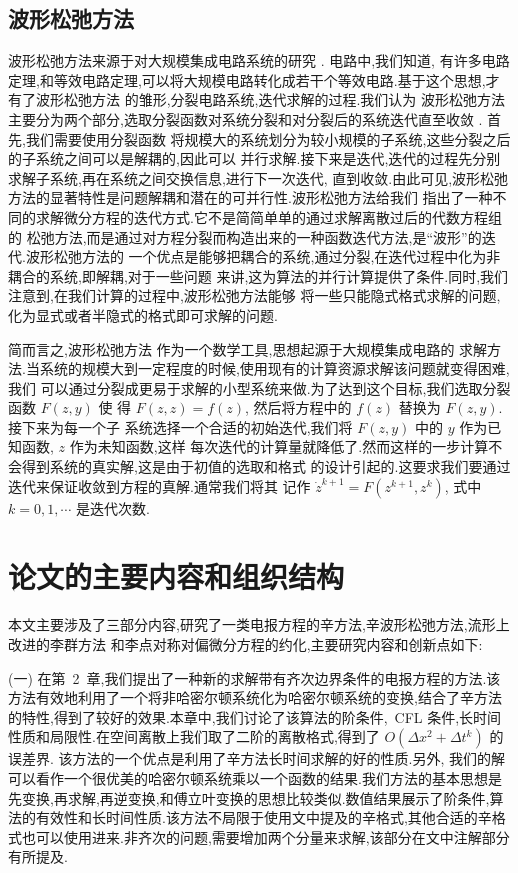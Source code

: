 \subsection{波形松弛方法}

波形松弛方法来源于对大规模集成电路系统的研究 \cite{lelarasmee1982waveform}. 电路中,我们知道,
有许多电路定理,和等效电路定理,可以将大规模电路转化成若干个等效电路.基于这个思想,才有了波形松弛方法
的雏形,分裂电路系统,迭代求解的过程.我们认为
波形松弛方法主要分为两个部分,选取分裂函数对系统分裂和对分裂后的系统迭代直至收敛
 \cite{jiang2009wr,burrage1995parallel,jacob1985waveform}. 首先,我们需要使用分裂函数
 将规模大的系统划分为较小规模的子系统,这些分裂之后的子系统之间可以是解耦的,因此可以
 并行求解.接下来是迭代,迭代的过程先分别求解子系统,再在系统之间交换信息,进行下一次迭代,
直到收敛.由此可见,波形松弛方法的显著特性是问题解耦和潜在的可并行性.波形松弛方法给我们
指出了一种不同的求解微分方程的迭代方式.它不是简简单单的通过求解离散过后的代数方程组的
松弛方法,而是通过对方程分裂而构造出来的一种函数迭代方法,是``波形''的迭代.波形松弛方法的
一个优点是能够把耦合的系统,通过分裂,在迭代过程中化为非耦合的系统,即解耦,对于一些问题
来讲,这为算法的并行计算提供了条件.同时,我们注意到,在我们计算的过程中,波形松弛方法能够
将一些只能隐式格式求解的问题,化为显式或者半隐式的格式即可求解的问题.

简而言之,波形松弛方法 \cite{jiang2009wr} 作为一个数学工具,思想起源于大规模集成电路的
求解方法.当系统的规模大到一定程度的时候,使用现有的计算资源求解该问题就变得困难,我们
可以通过分裂成更易于求解的小型系统来做.为了达到这个目标,我们选取分裂函数 $F(z,y)$ 使
得 $F(z,z)=f(z)$, 然后将方程中的 $f(z)$ 替换为 $F(z,y)$. 接下来为每一个子
系统选择一个合适的初始迭代,我们将 $F(z,y)$ 中的 $y$ 作为已知函数, $z$ 作为未知函数,这样
每次迭代的计算量就降低了.然而这样的一步计算不会得到系统的真实解,这是由于初值的选取和格式
的设计引起的.这要求我们要通过迭代来保证收敛到方程的真解.通常我们将其
记作 $\dot{z}^{k+1}=F(z^{k+1},z^{k})$, 式中 $k=0,1,\cdots$ 是迭代次数.

\section{论文的主要内容和组织结构}

本文主要涉及了三部分内容,研究了一类电报方程的辛方法,辛波形松弛方法,流形上改进的李群方法
和李点对称对偏微分方程的约化,主要研究内容和创新点如下:

(一) 在第~2~章,我们提出了一种新的求解带有齐次边界条件的电报方程的方法.该方法有效地利用了一个将非哈密尔顿系统化为哈密尔顿系统的变换,结合了辛方法的特性,得到了较好的效果.本章中,我们讨论了该算法的阶条件,~CFL 条件,长时间性质和局限性.在空间离散上我们取了二阶的离散格式,得到了 $O(\Delta x^2+ \Delta
t^k)$ 的误差界. 该方法的一个优点是利用了辛方法长时间求解的好的性质.另外, 我们的解可以看作一个很优美的哈密尔顿系统乘以一个函数的结果.我们方法的基本思想是先变换,再求解,再逆变换,和傅立叶变换的思想比较类似.数值结果展示了阶条件,算法的有效性和长时间性质.该方法不局限于使用文中提及的辛格式,其他合适的辛格式也可以使用进来.非齐次的问题,需要增加两个分量来求解,该部分在文中注解部分有所提及.

